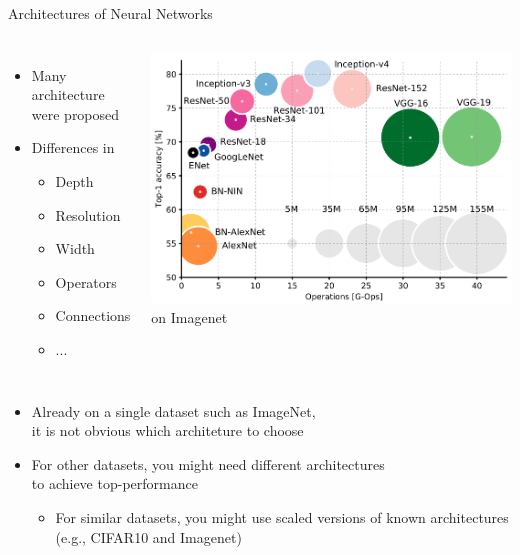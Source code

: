 \begin{frame}[c]{Architectures of Neural Networks}

\begin{columns}
	
	\begin{itemize}
		\item Many architecture were proposed
		\item Differences in 
		\begin{itemize}
			\item Depth
			\item Resolution
			\item Width
			\item Operators
			\item Connections
			\item ...
		\end{itemize}
	\end{itemize}
	
	
	\centering
	\includegraphics[width=1.0\textwidth]{images/overview_achitecture_perf.PNG}
	on Imagenet~
	
\end{columns}

\begin{itemize}
	\item Already on a single dataset such as ImageNet,\\ it is not obvious which architeture to choose
	\item For other datasets, you might need different architectures\\ to achieve top-performance
	\begin{itemize}
		\item For similar datasets, you might use scaled versions of known architectures (e.g., CIFAR10 and Imagenet)
	\end{itemize}
\end{itemize}

\end{frame}
